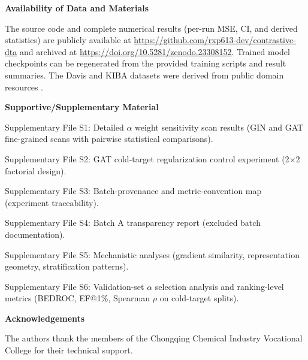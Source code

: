 \documentclass[10pt,a4paper,twocolumn]{article}
\begin{document}
\vspace{0.5em}
\noindent\textbf{Availability of Data and Materials}

\noindent The source code and complete numerical results (per-run MSE, CI, and derived statistics) are publicly available at \url{https://github.com/rxp613-dev/contrastive-dta} and archived at \url{https://doi.org/10.5281/zenodo.23308152}. Trained model checkpoints can be regenerated from the provided training scripts and result summaries. The Davis and KIBA datasets were derived from public domain resources \cite{davis2011predicting,tang2014kiba}.

\vspace{0.5em}
\noindent\textbf{Supportive/Supplementary Material}

\noindent Supplementary File S1: Detailed $\alpha$ weight sensitivity scan results (GIN and GAT fine-grained scans with pairwise statistical comparisons).

\noindent Supplementary File S2: GAT cold-target regularization control experiment (2$\times$2 factorial design).

\noindent Supplementary File S3: Batch-provenance and metric-convention map (experiment traceability).

\noindent Supplementary File S4: Batch A transparency report (excluded batch documentation).

\noindent Supplementary File S5: Mechanistic analyses (gradient similarity, representation geometry, stratification patterns).

\noindent Supplementary File S6: Validation-set $\alpha$ selection analysis and ranking-level metrics (BEDROC, EF@1\%, Spearman $\rho$ on cold-target splits).

\vspace{0.5em}
\noindent\textbf{Acknowledgements}

\noindent The authors thank the members of the Chongqing Chemical Industry Vocational College for their technical support.
\end{document}
